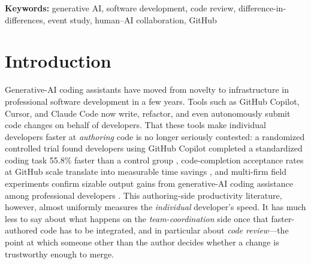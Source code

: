 \documentclass[12pt]{article}
\begin{document}
\noindent\textbf{Keywords:} generative AI, software development, code
review, difference-in-differences, event study, human--AI collaboration,
GitHub

\doublespacing

\section{Introduction}

Generative-AI coding assistants have moved from novelty to infrastructure
in professional software development in a few years. Tools such as GitHub
Copilot, Cursor, and Claude Code now write, refactor, and even
autonomously submit code changes on behalf of developers. That these tools
make individual developers faster at \emph{authoring} code is no longer
seriously contested: a randomized controlled trial found developers using
GitHub Copilot completed a standardized coding task 55.8\% faster than a
control group \cite{peng2023impact}, code-completion acceptance rates at
GitHub scale translate into measurable time savings
\cite{ziegler2022productivity}, and multi-firm field experiments confirm
sizable output gains from generative-AI coding assistance among
professional developers \cite{cui2024effects}. This authoring-side
productivity literature, however, almost uniformly measures the
\emph{individual} developer's speed. It has much less to say about what
happens on the \emph{team-coordination} side once that faster-authored
code has to be integrated, and in particular about \emph{code review}---the
point at which someone other than the author decides whether a change is
trustworthy enough to merge.
\end{document}
